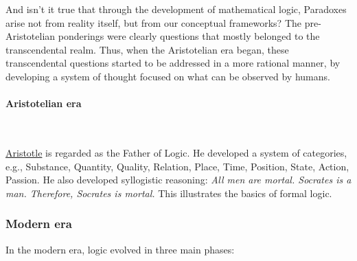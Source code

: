 \documentclass[12pt,a4paper,openany]{article}
\begin{document}
\begin{enumerate}
And isn't it true that through the development of mathematical logic,
Paradoxes arise not from reality itself, but from our conceptual frameworks? 
The pre-Aristotelian ponderings were clearly questions that mostly belonged to the transcendental realm. 
Thus, when the Aristotelian era began, these transcendental questions started to be addressed in a more rational manner, by developing a system of thought focused on what can be observed by humans.


\end{enumerate}

\paragraph{Aristotelian era}\label{aristotelian-era}\

\href{https://id.wikipedia.org/wiki/Aristoteles}{Aristotle} is regarded
as the Father of Logic. He developed a system of categories, e.g.,
Substance, Quantity, Quality, Relation, Place, Time, Position, State,
Action, Passion. He also developed syllogistic reasoning:  
\emph{All men are mortal. Socrates is a man. Therefore, Socrates is
mortal.} This illustrates the basics of formal logic.

\subsubsection{Modern era}\label{modern-era}
In the modern era, logic evolved in three main phases:
\end{document}
